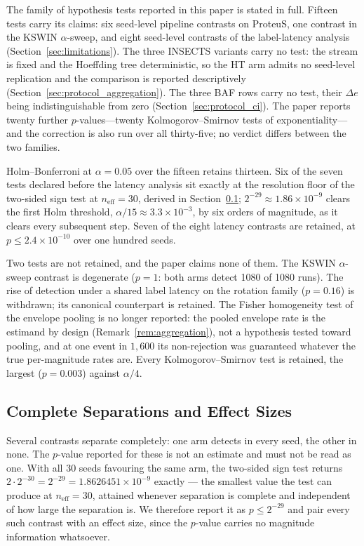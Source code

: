 The family of hypothesis tests reported in this paper is stated in full. Fifteen tests carry its
claims: six seed-level pipeline contrasts on ProteuS, one contrast in the KSWIN $\alpha$-sweep,
and eight seed-level contrasts of the label-latency analysis (Section~\ref{sec:limitations}). The
three INSECTS variants carry no test: the stream is fixed and the Hoeffding tree deterministic,
so the HT arm admits no seed-level replication and the comparison is reported descriptively
(Section~\ref{sec:protocol_aggregation}). The three BAF
rows carry no test, their $\Delta e$ being indistinguishable from zero
(Section~\ref{sec:protocol_ci}). The paper reports twenty further $p$-values---twenty
Kolmogorov--Smirnov tests of exponentiality---and the
correction is also run over all thirty-five; no verdict differs between the two families.

Holm--Bonferroni at $\alpha = 0.05$ over the fifteen retains thirteen. Six of the seven tests
declared before the latency analysis sit exactly at the resolution floor of the two-sided sign test
at $n_{\mathrm{eff}} = 30$, derived in Section~\ref{sec:protocol_separation}; $2^{-29} \approx 1.86
\times 10^{-9}$ clears the first Holm threshold, $\alpha/15 \approx 3.3 \times 10^{-3}$, by six
orders of magnitude, as it clears every subsequent step. Seven of the eight latency contrasts are
retained, at $p \le 2.4 \times 10^{-10}$ over one hundred seeds.

Two tests are not retained, and the paper claims none of them. The KSWIN $\alpha$-sweep contrast
is degenerate ($p = 1$: both arms detect 1080 of 1080 runs). The rise of detection under a
shared label latency on the rotation family ($p = 0.16$) is withdrawn; its canonical counterpart is
retained. The Fisher homogeneity test of the envelope pooling is no longer reported: the pooled
envelope rate is the estimand by design (Remark~\ref{rem:aggregation}), not a hypothesis tested
toward pooling, and at one event in $1{,}600$ its non-rejection was guaranteed whatever the true
per-magnitude rates are. Every Kolmogorov--Smirnov test is
retained, the largest ($p = 0.003$) against $\alpha/4$.

\subsection{Complete Separations and Effect Sizes}\label{sec:protocol_separation}

Several contrasts separate completely: one arm detects in every seed, the other in none. The
$p$-value reported for these is not an estimate and must not be read as one. With all 30 seeds
favouring the same arm, the two-sided sign test returns
$2 \cdot 2^{-30} = 2^{-29} = 1.8626451 \times 10^{-9}$ exactly --- the smallest value the test can
produce at $n_{\mathrm{eff}} = 30$, attained whenever separation is complete and independent of how
large the separation is. We therefore report it as $p \le 2^{-29}$ and pair every such contrast
with an effect size, since the $p$-value carries no magnitude information whatsoever.


